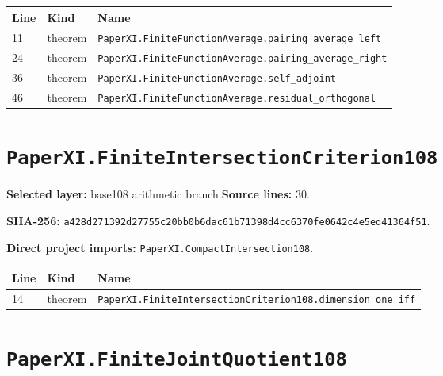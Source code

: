 \documentclass[10pt,oneside]{book}
\begin{document}
\begin{longtable}{@{}p{}p{}p{}@{}}\toprule Line&Kind&Name\\\midrule\endhead

11&theorem&\nolinkurl{PaperXI.FiniteFunctionAverage.pairing_average_left}\\

24&theorem&\nolinkurl{PaperXI.FiniteFunctionAverage.pairing_average_right}\\

36&theorem&\nolinkurl{PaperXI.FiniteFunctionAverage.self_adjoint}\\

46&theorem&\nolinkurl{PaperXI.FiniteFunctionAverage.residual_orthogonal}\\

\bottomrule\end{longtable}

\section{\texorpdfstring{\nolinkurl{PaperXI.FiniteIntersectionCriterion108}}{PaperXI.FiniteIntersectionCriterion108}}\label{module:PaperXI.FiniteIntersectionCriterion108}

\textbf{Selected layer:} base108 arithmetic branch.\quad\textbf{Source lines:} 30.\par\textbf{SHA-256:} {\scriptsize\nolinkurl{a428d271392d27755c20bb0b6dac61b71398d4cc6370fe0642c4e5ed41364f51}}.


\textbf{Direct project imports:} \nolinkurl{PaperXI.CompactIntersection108}.

\begin{longtable}{@{}p{}p{}p{}@{}}\toprule Line&Kind&Name\\\midrule\endhead

14&theorem&\nolinkurl{PaperXI.FiniteIntersectionCriterion108.dimension_one_iff}\\

\bottomrule\end{longtable}

\section{\texorpdfstring{\nolinkurl{PaperXI.FiniteJointQuotient108}}{PaperXI.FiniteJointQuotient108}}\label{module:PaperXI.FiniteJointQuotient108}
\end{document}
